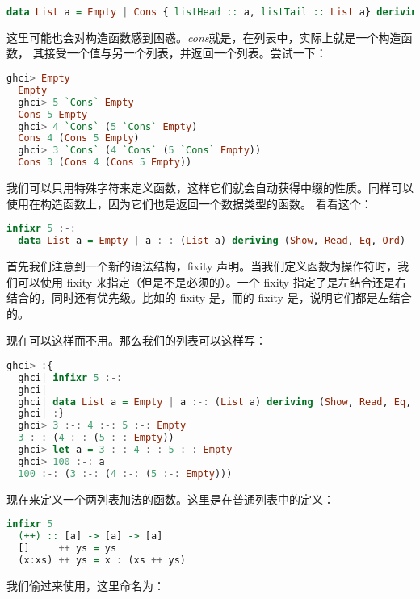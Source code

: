 \documentclass[./main.tex]{subfiles}
\begin{document}
\begin{lstlisting}[language=Haskell]
  data List a = Empty | Cons { listHead :: a, listTail :: List a} deriving (Show, Read, Eq, Ord)
\end{lstlisting}

这里可能也会对构造函数感到困惑。\textit{cons}就是\acode{:}，在列表中，\acode{:}实际上就是一个构造函数，
其接受一个值与另一个列表，并返回一个列表。尝试一下：

\begin{lstlisting}[language=Haskell]
  ghci> Empty
  Empty
  ghci> 5 `Cons` Empty
  Cons 5 Empty
  ghci> 4 `Cons` (5 `Cons` Empty)
  Cons 4 (Cons 5 Empty)
  ghci> 3 `Cons` (4 `Cons` (5 `Cons` Empty))
  Cons 3 (Cons 4 (Cons 5 Empty))
\end{lstlisting}

我们可以只用特殊字符来定义函数，这样它们就会自动获得中缀的性质。同样可以使用在构造函数上，因为它们也是返回一个数据类型的函数。
看看这个：

\begin{lstlisting}[language=Haskell]
  infixr 5 :-:
  data List a = Empty | a :-: (List a) deriving (Show, Read, Eq, Ord)
\end{lstlisting}

首先我们注意到一个新的语法结构，fixity 声明。当我们定义函数为操作符时，我们可以使用 fixity 来指定（但是不是必须的）。一个
fixity 指定了是左结合还是右结合的，同时还有优先级。比如\acode{*}的 fixity 是，而\acode{+}的
fixity 是，说明它们都是左结合的。

现在可以这样而不用。那么我们的列表可以这样写：

\begin{lstlisting}[language=Haskell]
  ghci> :{
  ghci| infixr 5 :-:
  ghci|
  ghci| data List a = Empty | a :-: (List a) deriving (Show, Read, Eq, Ord)
  ghci| :}
  ghci> 3 :-: 4 :-: 5 :-: Empty
  3 :-: (4 :-: (5 :-: Empty))
  ghci> let a = 3 :-: 4 :-: 5 :-: Empty
  ghci> 100 :-: a
  100 :-: (3 :-: (4 :-: (5 :-: Empty)))
\end{lstlisting}

现在来定义一个两列表加法的函数。这里是\acode{++}在普通列表中的定义：

\begin{lstlisting}[language=Haskell]
  infixr 5
  (++) :: [a] -> [a] -> [a]
  []     ++ ys = ys
  (x:xs) ++ ys = x : (xs ++ ys)
\end{lstlisting}

我们偷过来使用，这里命名为：
\end{document}
